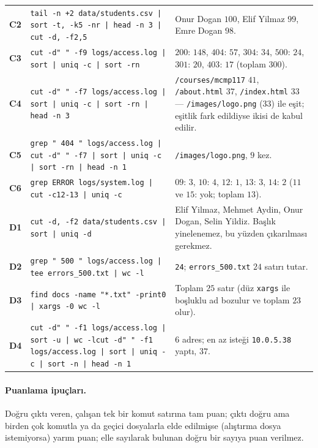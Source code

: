 \documentclass[11pt,a4paper]{article}
\newcommand{\cmd}[1]{\texttt{#1}}
\begin{document}
{\begin{longtable}{@{}p{0.8cm}>{\raggedright\arraybackslash}p{8.4cm}>{\raggedright\arraybackslash}p{6.3cm}@{}}
\textbf{C2} & \texttt{tail -n +2 data/students.csv |\allowbreak{} sort -t, -k5 -nr |\allowbreak{} head -n 3 |\allowbreak{} cut -d, -f2,5} & Onur Dogan $100$, Elif Yilmaz $99$, Emre Dogan $98$.\\
\textbf{C3} & \texttt{cut -d" " -f9 logs/access.log |\allowbreak{} sort |\allowbreak{} uniq -c |\allowbreak{} sort -rn} & $200$: $148$, $404$: $57$, $304$: $34$, $500$: $24$, $301$: $20$, $403$: $17$ (toplam $300$).\\
\textbf{C4} & \texttt{cut -d" " -f7 logs/access.log |\allowbreak{} sort |\allowbreak{} uniq -c |\allowbreak{} sort -rn |\allowbreak{} head -n 3} & \texttt{/courses/mcmp117} $41$, \texttt{/about.html} $37$, \texttt{/index.html} $33$ --- \texttt{/images/logo.png} ($33$) ile eşit; eşitlik fark edildiyse ikisi de kabul edilir.\\
\textbf{C5} & \texttt{grep " 404 " logs/access.log |\allowbreak{} cut -d" " -f7 |\allowbreak{} sort |\allowbreak{} uniq -c |\allowbreak{} sort -rn |\allowbreak{} head -n 1} & \texttt{/images/logo.png}, $9$ kez.\\
\textbf{C6} & \texttt{grep ERROR logs/system.log |\allowbreak{} cut -c12-13 |\allowbreak{} uniq -c} & $09$: $3$, $10$: $4$, $12$: $1$, $13$: $3$, $14$: $2$ ($11$ ve $15$: yok; toplam $13$).\\
\textbf{D1} & \texttt{cut -d, -f2 data/students.csv |\allowbreak{} sort |\allowbreak{} uniq -d} & Elif Yilmaz, Mehmet Aydin, Onur Dogan, Selin Yildiz. Başlık yinelenemez, bu yüzden çıkarılması gerekmez.\\
\textbf{D2} & \texttt{grep " 500 " logs/access.log |\allowbreak{} tee errors\_500.txt |\allowbreak{} wc -l} & \texttt{24}; \texttt{errors\_500.txt} $24$ satırı tutar.\\
\textbf{D3} & \texttt{find docs -name "*.txt" -print0 |\allowbreak{} xargs -0 wc -l} & Toplam $25$ satır (düz \cmd{xargs} ile boşluklu ad bozulur ve toplam $23$ olur).\\
\textbf{D4} & \texttt{cut -d" " -f1 logs/access.log |\allowbreak{} sort -u |\allowbreak{} wc -l}\newline \texttt{cut -d" " -f1 logs/access.log |\allowbreak{} sort |\allowbreak{} uniq -c |\allowbreak{} sort -n |\allowbreak{} head -n 1} & $6$ adres; en az isteği \texttt{10.0.5.38} yaptı, $37$.\\
\bottomrule
\end{longtable}
}

\paragraph{Puanlama ipuçları.} Doğru çıktı veren, çalışan tek bir komut satırına tam puan; çıktı doğru ama birden çok komutla ya da geçici dosyalarla elde edilmişse (alıştırma dosya istemiyorsa) yarım puan; elle sayılarak bulunan doğru bir sayıya puan verilmez.
\end{document}

